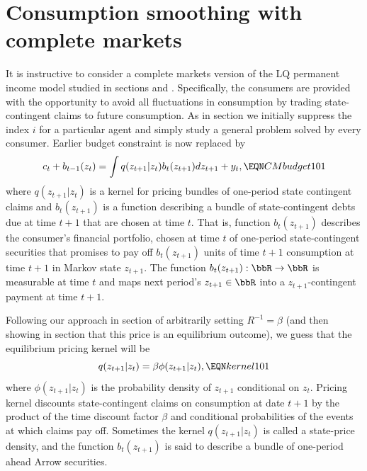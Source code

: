 \section{Consumption smoothing with complete markets}\label{sec:LQcomplete}%
It is instructive to consider a complete markets
version of the LQ permanent income model 
studied in sections  and 
. Specifically, the 
consumers are provided with the opportunity
to avoid all fluctuations in consumption by trading state-contingent claims to future consumption. As in
section  we initially suppress the 
index $i$ for a particular agent and simply study
a general problem solved by every consumer. 
Earlier budget constraint  is now replaced by
$$ c_t + b_{t-1}(z_t) = \int  q(z_{t+1} | z_t ) b_t(z_{t+1}) 
d z_{t+1} + y_t , \EQN CMbudget101 $$
where $q(z_{t+1} | z_t)$ is a  kernel for pricing bundles of  one-period  state contingent claims and $b_t(z_{t+1})$ is 
a function describing a bundle of state-contingent debts 
due at time $t+1$ that are chosen at time $t$. That is,
function $b_{t}(z_{t+1})$ describes the consumer's financial portfolio, chosen  at time $t$ of one-period state-contingent
securities  that promises to pay off $b_{t}(z_{t+1})$ units 
of time $t+1$ consumption at time $t+1$ in Markov state 
$z_{t+1}$. The function  
$b_{t}(z_{t+1}): \bbR \rightarrow \bbR$ 
is measurable at time $t$ and maps next period's 
$z_{t+1} \in \bbR$ into a $z_{t+1}$-contingent payment 
at time $t+1$.

Following our approach in section  of
arbitrarily setting $R^{-1}=\beta$ (and then showing in
section  that this price is an 
equilibrium outcome), we guess that the equilibrium 
pricing kernel will be
$$ q(z_{t+1} | z_t ) = \beta \phi(z_{t+1} | z_t) , \EQN kernel101 $$
where $\phi(z_{t+1} | z_t)$ is the probability density of 
$z_{t+1}$ conditional on $z_t$. 
Pricing kernel  discounts state-contingent claims on consumption at date $t+1$ by the product of the time  discount factor $\beta$ and  conditional probabilities of  the  events
at which  claims pay off. 
Sometimes the kernel $q(z_{t+1} | z_t)$ is called  a state-price density,
and the function $b_t(z_{t+1})$ is said to describe a bundle of one-period ahead Arrow securities.



